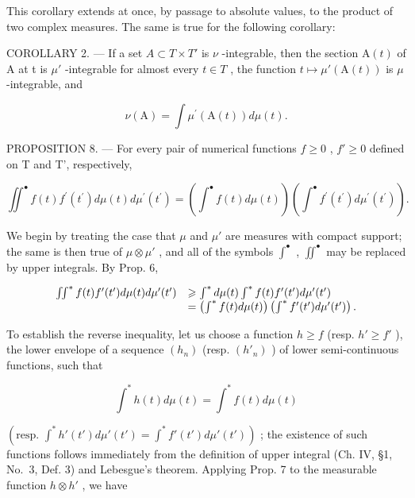 This corollary extends at once, by passage to absolute values, to the product of two complex measures. The same is true for the following corollary:

COROLLARY 2. --- If a set \(A \subset T \times T'\) is \(\nu\) -integrable, then the section \(\mathrm{A}(t)\) of A at t is \(\mu'\) -integrable for almost every \(t \in T\) , the function \(t \mapsto \mu'(\mathrm{A}(t))\) is \(\mu\) -integrable, and

\[
\nu (\mathrm{A}) = \int \mu^ {\prime} (\mathrm{A} (t)) d \mu (t).\tag{9}
\]

PROPOSITION 8. --- For every pair of numerical functions \(f \geqslant 0\) , \(f' \geqslant 0\) defined on T and T', respectively,

\[
\iint^ {\bullet} f (t) f ^ {\prime} \left(t ^ {\prime}\right) d \mu (t) d \mu^ {\prime} \left(t ^ {\prime}\right) = \left(\int^ {\bullet} f (t) d \mu (t)\right) \left(\int^ {\bullet} f ^ {\prime} \left(t ^ {\prime}\right) d \mu^ {\prime} \left(t ^ {\prime}\right)\right).\tag{10}
\]

We begin by treating the case that \(\mu\) and \(\mu'\) are measures with compact support; the same is then true of \(\mu \otimes \mu'\) , and all of the symbols \(\int^{\bullet}\) , \(\iint^{\bullet}\) may be replaced by upper integrals. By Prop. 6,

\[
\begin{array}{r l} \iint^ {*} f (t) f ^ {\prime} (t ^ {\prime}) d \mu (t) d \mu^ {\prime} (t ^ {\prime}) & \geqslant \int^ {*} d \mu (t) \int^ {*} f (t) f ^ {\prime} (t ^ {\prime}) d \mu^ {\prime} (t ^ {\prime}) \\ & = \left(\int^ {*} f (t) d \mu (t)\right) \left(\int^ {*} f ^ {\prime} (t ^ {\prime}) d \mu^ {\prime} (t ^ {\prime})\right). \end{array}
\]

To establish the reverse inequality, let us choose a function \(h \geqslant f\) (resp. \(h' \geqslant f'\) ), the lower envelope of a sequence \((h_n)\) (resp. \((h'_n)\) ) of lower semi-continuous functions, such that

\[
\int^ {*} h (t) d \mu (t) = \int^ {*} f (t) d \mu (t)
\]

\((\text{resp. } \int^{*} h'(t') d\mu'(t') = \int^{*} f'(t') d\mu'(t'))\) ; the existence of such functions follows immediately from the definition of upper integral (Ch. IV, §1, No.~3, Def. 3) and Lebesgue's theorem. Applying Prop. 7 to the measurable function \(h \otimes h'\) , we have


